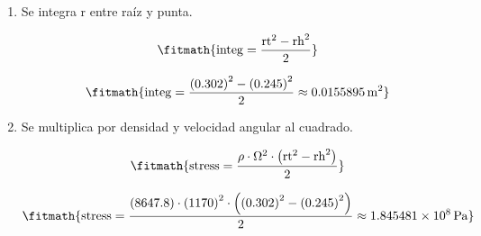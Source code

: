 \begin{enumerate}

\item Se integra r entre raíz y punta.

\[\fitmath{\mathrm{integ}=\frac{{\mathrm{rt}}^{2}-{\mathrm{rh}}^{2}}{2}}\]

\[\fitmath{\mathrm{integ}=\frac{{(0.302)}^{2}-{(0.245)}^{2}}{2}\approx 0.0155895\,\mathrm{m^{2}}}\]

\item Se multiplica por densidad y velocidad angular al cuadrado.

\[\fitmath{\mathrm{stress}=\frac{\rho\cdot {\Omega}^{2}\cdot \left({\mathrm{rt}}^{2}-{\mathrm{rh}}^{2}\right)}{2}}\]

\[\fitmath{\mathrm{stress}=\frac{(8647.8)\cdot {(1170)}^{2}\cdot \left({(0.302)}^{2}-{(0.245)}^{2}\right)}{2}\approx 1.845481\times10^{8}\,\mathrm{Pa}}\]

\end{enumerate}
